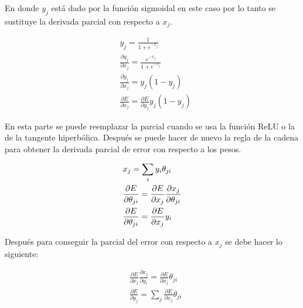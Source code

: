En donde $y_{j}$ está dado por la función sigmoidal en este caso por lo tanto se sustituye la derivada parcial con respecto a $x_{j}$.
\begin{spreadlines}{10pt}
	\begin{alignat*}{4}
		 & y_{j} =\frac{1}{1+e^{-x_{j}}}                                                         \\
		 & \frac{\partial y_{j}}{\partial x_{j}} =\frac{e^{-x_{j}}}{1+e^{-x_{j}}}                \\
		 & \frac{\partial y_{j}}{\partial x_{j}}=y_{j} (1-y_{j})                                 \\
		 & \frac{\partial E}{\partial x_{j}} =\frac{\partial E}{\partial y_{j}}  y_{j}( 1-y_{j})
	\end{alignat*}
\end{spreadlines}

\par En esta parte se puede reemplazar la parcial cuando se usa la función \gls{ReLU} o la de la tangente hiperbólica. Después se puede hacer de nuevo la regla de la cadena para obtener la derivada parcial de error con respecto a los pesos.

\begin{spreadlines}{10pt}
	\begin{alignat*}{3}
		 & x_{j}=\sum_{i} y_{i}\theta_{ji}                                                                                          \\ \vspace{100pt}
		 & \frac{\partial E}{\partial \theta _{ji}} =\frac{\partial E}{\partial x_{j}} \frac{\partial x_{j}}{\partial \theta _{ji}} \\
		 & \frac{\partial E}{\partial \theta _{ji}} =\frac{\partial E}{\partial x_{j}}y_{i}
	\end{alignat*}
\end{spreadlines}

\par Después para conseguir la parcial del error con respecto a $x_{j}$ se debe hacer lo siguiente:

\begin{spreadlines}{10pt}
	\begin{alignat*}{3}
		 & \frac{\partial E}{\partial x_{j}} \frac{\partial x_{j}}{\partial y_{i}} =\frac{\partial E}{\partial x_{j}} \theta _{ji} \\
		 & \frac{\partial E}{\partial y_{j}} =\sum _{j}\frac{\partial E}{\partial x_{j}} \theta _{ji}
	\end{alignat*}
\end{spreadlines}

